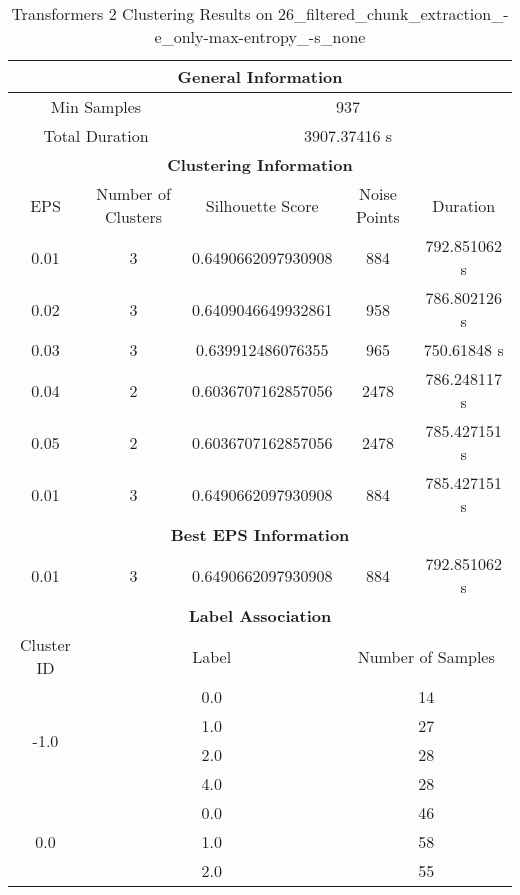     
    \begin{longtable}{|c|c|c|c|c|}
    \caption{Transformers 2 Clustering Results on 26\_filtered\_chunk\_extraction\_-e\_only-max-entropy\_-s\_none} \label{tab:transformers_2_clustering_results}\\
    \hline
    \multicolumn{5}{|c|}{\textbf{General Information}} \\
    \hline
    \multicolumn{2}{|c|}{Min Samples} & \multicolumn{3}{c|}{937} \\
    \multicolumn{2}{|c|}{Total Duration} & \multicolumn{3}{c|}{3907.37416 s} \\
    \hline
    \multicolumn{5}{|c|}{\textbf{Clustering Information}} \\
    \hline
    EPS & Number of Clusters & Silhouette Score & Noise Points & Duration \\
    0.01 & 3 & 0.6490662097930908 & 884 & 792.851062 s\\
    0.02 & 3 & 0.6409046649932861 & 958 & 786.802126 s\\
    0.03 & 3 & 0.639912486076355 & 965 & 750.61848 s\\
    0.04 & 2 & 0.6036707162857056 & 2478 & 786.248117 s\\
    0.05 & 2 & 0.6036707162857056 & 2478 & 785.427151 s\\
    0.01 & 3 & 0.6490662097930908 & 884 & 785.427151 s\\
    \hline
    \multicolumn{5}{|c|}{\textbf{Best EPS Information}} \\
    \hline
    0.01 & 3 & 0.6490662097930908 & 884 & 792.851062 s\\
    \hline
    \multicolumn{5}{|c|}{\textbf{Label Association}} \\
    \hline
    Cluster ID & \multicolumn{2}{c|}{Label} & \multicolumn{2}{c|}{Number of Samples} \\
    \hline
    \multirow{4}{*}{-1.0} & \multicolumn{2}{c|}{0.0} & \multicolumn{2}{c|}{14} \\
    & \multicolumn{2}{c|}{1.0} & \multicolumn{2}{c|}{27} \\
    & \multicolumn{2}{c|}{2.0} & \multicolumn{2}{c|}{28} \\
    & \multicolumn{2}{c|}{4.0} & \multicolumn{2}{c|}{28} \\
    \hline
    \multirow{4}{*}{0.0} & \multicolumn{2}{c|}{0.0} & \multicolumn{2}{c|}{46} \\
    & \multicolumn{2}{c|}{1.0} & \multicolumn{2}{c|}{58} \\
    & \multicolumn{2}{c|}{2.0} & \multicolumn{2}{c|}{55} \\

\end{longtable}
